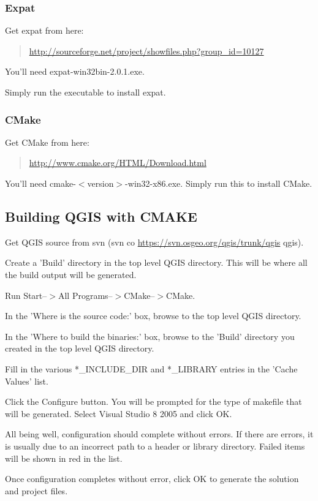 \subsubsection{Expat}
Get expat from here:

	\begin{quotation}
\url{http://sourceforge.net/project/showfiles.php?group\_id=10127}
	\end{quotation}
You'll need expat-win32bin-2.0.1.exe.

Simply run the executable to install expat.

\subsubsection{CMake}
Get CMake from here:

	\begin{quotation}
\url{http://www.cmake.org/HTML/Download.html}
	\end{quotation}
You'll need cmake-$<$version$>$-win32-x86.exe. Simply run this to install CMake.

\subsection{Building QGIS with CMAKE}
Get QGIS source from svn (svn co \url{https://svn.osgeo.org/qgis/trunk/qgis} qgis).

Create a 'Build' directory in the top level QGIS directory. This will be where all the build output will be generated.

Run Start--$>$All Programs--$>$CMake--$>$CMake. 

In the 'Where is the source code:' box, browse to the top level QGIS directory.

In the 'Where to build the binaries:' box, browse to the 'Build' directory you created in the top level QGIS directory.

Fill in the various *\_INCLUDE\_DIR and *\_LIBRARY entries in the 'Cache Values' list.

Click the Configure button. You will be prompted for the type of makefile that will be generated. Select Visual Studio 8 2005 and click OK.

All being well, configuration should complete without errors. If there are errors, it is usually due to an incorrect path to a header or library directory. Failed items will be shown in red in the list.

Once configuration completes without error, click OK to generate the solution and project files.

